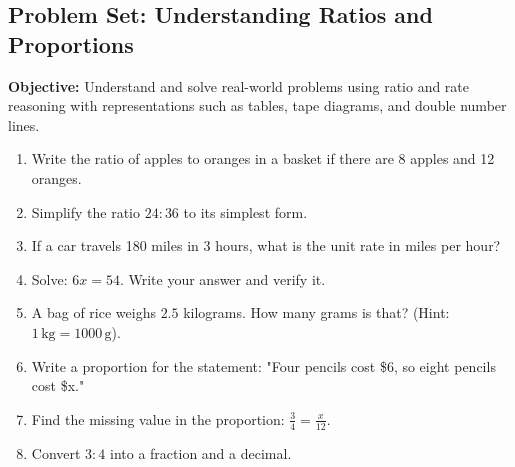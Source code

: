 \documentclass[12pt]{article}
\title{}
\date{}
\begin{document}
\subsection*{Problem Set: Understanding Ratios and Proportions}
\onehalfspacing

\begin{tcolorbox}[colframe=black!40, colback=gray!5, 
coltitle=black, colbacktitle=black!20, fonttitle=\bfseries\Large, 
title=Learning Objective, halign title=center, left=5pt, right=5pt, top=5pt, bottom=15pt]
\textbf{Objective:} Understand and solve real-world problems using ratio and rate reasoning with representations such as tables, tape diagrams, and double number lines.


\end{tcolorbox}

\begin{tcolorbox}[colframe=black!60, colback=white, 
coltitle=black, colbacktitle=black!15, fonttitle=\bfseries\Large, 
title=Exercises, halign title=center, left=10pt, right=10pt, top=10pt, bottom=60pt]
\begin{enumerate}[itemsep=3em]
    \item Write the ratio of apples to oranges in a basket if there are 8 apples and 12 oranges.
    \item Simplify the ratio \( 24:36 \) to its simplest form.
    \item If a car travels 180 miles in 3 hours, what is the unit rate in miles per hour?
    
    \item Solve: \( 6x = 54 \). Write your answer and verify it.
    \item A bag of rice weighs \( 2.5 \) kilograms. How many grams is that? (Hint: \( 1 \, \text{kg} = 1000 \, \text{g} \)).
    \item Write a proportion for the statement: "Four pencils cost \$6, so eight pencils cost \$x."
    \item Find the missing value in the proportion: \( \frac{3}{4} = \frac{x}{12} \).
    \item Convert \( 3:4 \) into a fraction and a decimal.
\end{enumerate}
\end{tcolorbox}

\vspace{1em}
\end{document}
